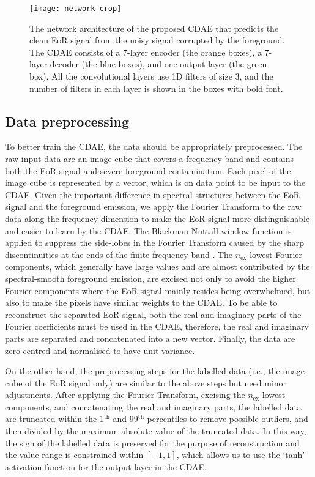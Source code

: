 \documentclass[letters,a4paper,fleqn,usenatbib]{mnras}
\newcommand{\R}[1]{\mathrm{#1}}
\begin{document}
\begin{figure}
  \centering
  \texttt{[image: network-crop]}
  \caption{\label{fig:network}%
    The network architecture of the proposed CDAE that
    predicts the clean EoR signal from the noisy signal corrupted by
    the foreground.
    The CDAE consists of a 7-layer encoder (the orange boxes),
    a 7-layer decoder (the blue boxes), and one output layer
    (the green box).
    All the convolutional layers use 1D filters of size 3, and
    the number of filters in each layer is shown in the boxes
    with bold font.}
\end{figure}


\subsection{Data preprocessing}
\label{sec:data}

To better train the CDAE, the data should be appropriately preprocessed.
The raw input data are an image cube that covers a frequency band and
contains both the EoR signal and severe foreground contamination.
Each pixel of the image cube is represented by a vector, which is on
data point to be input to the CDAE.
Given the important difference in spectral structures between the EoR
signal and the foreground emission, we apply the Fourier Transform to
the raw data along the frequency dimension to make the EoR signal more
distinguishable and easier to learn by the CDAE.
The Blackman-Nuttall window function is applied to suppress the side-lobes
in the Fourier Transform caused by the sharp discontinuities at the ends
of the finite frequency band \citep[e.g.,][]{chapman2016}.
The $n_{\R{ex}}$ lowest Fourier components, which generally have large
values and are almost contributed by the spectral-smooth foreground
emission, are excised not only to avoid the higher Fourier components
where the EoR signal mainly resides being overwhelmed, but also to
make the pixels have similar weights to the CDAE.
To be able to reconstruct the separated EoR signal, both the real and
imaginary parts of the Fourier coefficients must be used in the CDAE,
therefore, the real and imaginary parts are separated and concatenated
into a new vector.
Finally, the data are zero-centred and normalised to have unit variance.

On the other hand, the preprocessing steps for the labelled data (i.e.,
the image cube of the EoR signal only) are similar to the above steps
but need minor adjustments.
After applying the Fourier Transform, excising the $n_{\R{ex}}$ lowest
components, and concatenating the real and imaginary parts,
the labelled data are truncated within the 1$^{\R{th}}$ and 99$^{\R{th}}$
percentiles to remove possible outliers, and then divided by the
maximum absolute value of the truncated data.
In this way, the sign of the labelled data is preserved for the purpose
of reconstruction and the value range is constrained within $[-1, 1]$,
which allows us to use the `tanh' activation function for the output
layer in the CDAE.
\end{document}
